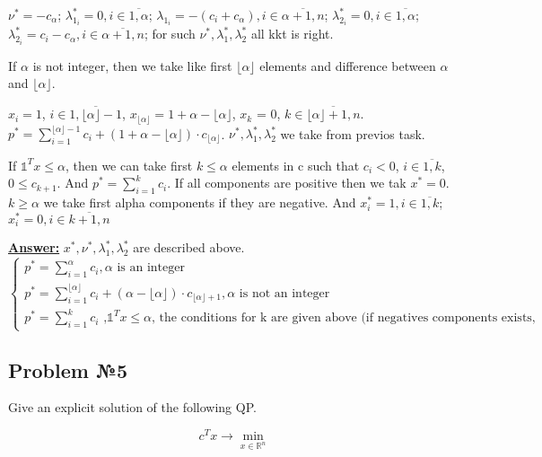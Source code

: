 $\nu^* = -c_{\alpha}$; $\lambda_{1_i}^* = 0, i \in \overline{1, \alpha}$; $\lambda_{1_i} = -(c_i + c_{\alpha}), i \in \overline{\alpha + 1, n}$;
$\lambda_{2_i}^* = 0, i \in \overline{1, \alpha}$; $\lambda_{2_i}^* = c_i - c_{\alpha}, i \in \overline{\alpha +1, n}$; for such 
$\nu^*, \lambda_1^*, \lambda_2^*$ all kkt is right.

If $\alpha$ is not integer, then we take like first $\lfloor \alpha \rfloor$ elements and difference between $\alpha$ and $\lfloor \alpha \rfloor$. 

$x_i = 1$, $i \in \overline{1, \lfloor \alpha \rfloor - 1}$, $x_{\lfloor \alpha \rfloor } = 1 + \alpha - \lfloor \alpha \rfloor$, $x_{k}$ = 0, $k \in \overline{\lfloor \alpha \rfloor + 1, n}$. $p^* = \sum\limits_{i=1}^{\lfloor \alpha \rfloor - 1}c_i + (1 + \alpha - \lfloor \alpha \rfloor) \cdot c_{\lfloor \alpha \rfloor }$. $\nu^*, \lambda_1^*, \lambda_2^*$ we take from previos task.

If $\mathds{1}^Tx \leq \alpha$, then we can take first $k \leq \alpha$ elements in c such that $c_i < 0$, $i \in \overline{1, k}$, $0 \leq c_{k+1}$. And $p^* = \sum\limits_{i=1}^kc_i$. If all components are positive then we tak $x^* = 0$. $k \geq \alpha$ we take first alpha components if they are negative. And $x_i^* = 1, i \in \overline{1, k}$; $x_i^* = 0, i \in \overline{k+1, n}$

\underline{\textbf{Answer:}} $x^*, \nu^*, \lambda_1^*, \lambda_2^*$ are described above.
\begin{equation*}
    \begin{cases}
    p^* = \sum\limits_{i=1}^\alpha c_i, \alpha \text{ is an integer} \\
    p^* = \sum\limits_{i=1}^{\lfloor \alpha \rfloor}c_i + (\alpha - \lfloor \alpha \rfloor) \cdot c_{\lfloor \alpha \rfloor + 1}, \alpha \text{ is not an integer}  \\
    p^* = \sum\limits_{i=1}^kc_i \text{ ,} \mathds{1}^T x \leq \alpha \text{, the conditions for k are given above (if negatives components exists}, 
    \end{cases}
\end{equation*}

\subsection{Problem №5}
Give an explicit solution of the following QP.

\begin{equation*}
    c^T x  \xrightarrow{} \min\limits_{x \in \mathds{R}^n}
\end{equation*}

